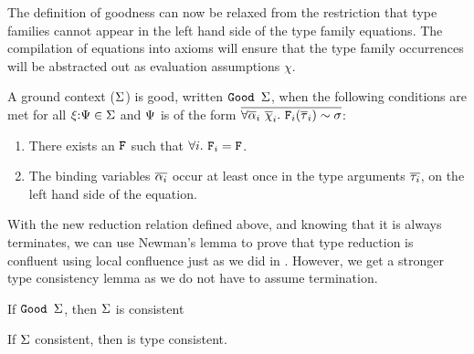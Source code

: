 \documentclass[format=acmsmall,manuscript,screen,nonacm,margin=1in,11pt]{acmart}
\begin{document}
The definition of goodness can now be relaxed from the restriction that type families
cannot appear in the left hand side of the type family equations.
The compilation of equations into axioms will ensure that the type family occurrences
will be abstracted out as evaluation assumptions $\chi$.
\begin{defn}
  A ground context ($\Sigma$) is good, written $\texttt{Good }\Sigma$, when
  the following conditions are met for all $\xi{:}\Psi\in\Sigma$ and
  $\Psi$ is of the form $\overline{\forall\overline{\alpha}_i~\overline{\chi}_i.~\texttt{F}_i(\overline{\tau}_i)\mathrel{\sim}\sigma}$:
  \begin{enumerate}
  \item There exists an $\texttt{F}$ such that  $\forall i.~\texttt{F}_i = \texttt{F}$.
  \item The binding variables $\overline{\alpha_i}$ occur at least once in the type arguments $\overline{\tau_i}$,
    on the left hand side of the equation.
  \end{enumerate}
\end{defn}
With the new reduction relation defined above, and knowing that it is always terminates,
we can use Newman's lemma\cite{newman_theories_1942} to prove that type reduction is confluent using
local confluence just as we did in \CLTF. However, we get a stronger type consistency lemma as we do not have to assume termination.
\begin{lemma} If $\texttt{Good }\Sigma$, then $\Sigma$ is consistent \end{lemma}
\begin{lemma} If $\Sigma$ consistent, then \QLTF is type consistent. \end{lemma}

\end{document}
